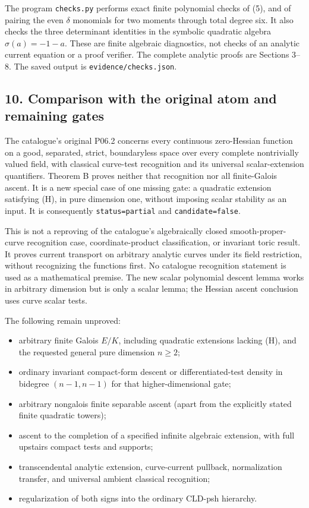 \documentclass[
  11pt,
]{article}
\providecommand{\tightlist}{%
  \setlength{\itemsep}{0pt}\setlength{\parskip}{0pt}}
\begin{document}
The program \texttt{checks.py} performs exact finite polynomial checks
of (5), and of pairing the even \(\delta\) monomials for two moments
through total degree six. It also checks the three determinant
identities in the symbolic quadratic algebra \(\sigma(a)=-1-a\). These
are finite algebraic diagnostics, not checks of an analytic current
equation or a proof verifier. The complete analytic proofs are Sections
3--8. The saved output is \texttt{evidence/checks.json}.

\subsection{10. Comparison with the original atom and remaining
gates}\label{comparison-with-the-original-atom-and-remaining-gates}

The catalogue's original P06.2 concerns every continuous zero-Hessian
function on a good, separated, strict, boundaryless space over every
complete nontrivially valued field, with classical curve-test
recognition and its universal scalar-extension quantifiers. Theorem B
proves neither that recognition nor all finite-Galois ascent. It is a
new special case of one missing gate: a quadratic extension satisfying
(H), in pure dimension one, without imposing scalar stability as an
input. It is consequently \texttt{status=partial} and
\texttt{candidate=false}.

This is not a reproving of the catalogue's algebraically closed
smooth-proper-curve recognition case, coordinate-product classification,
or invariant toric result. It proves current transport on arbitrary
analytic curves under its field restriction, without recognizing the
functions first. No catalogue recognition statement is used as a
mathematical premise. The new scalar polynomial descent lemma works in
arbitrary dimension but is only a scalar lemma; the Hessian ascent
conclusion uses curve scalar tests.

The following remain unproved:

\begin{itemize}
\tightlist
\item
  arbitrary finite Galois \(E/K\), including quadratic extensions
  lacking (H), and the requested general pure dimension \(n\geq2\);
\item
  ordinary invariant compact-form descent or differentiated-test density
  in bidegree \((n-1,n-1)\) for that higher-dimensional gate;
\item
  arbitrary nongalois finite separable ascent (apart from the explicitly
  stated finite quadratic towers);
\item
  ascent to the completion of a specified infinite algebraic extension,
  with full upstairs compact tests and supports;
\item
  transcendental analytic extension, curve-current pullback,
  normalization transfer, and universal ambient classical recognition;
\item
  regularization of both signs into the ordinary CLD-psh hierarchy.
\end{itemize}
\end{document}
